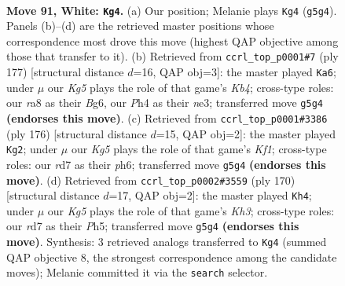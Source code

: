 \documentclass[11pt]{article}
\begin{document}
\clearpage

\begin{figure}[p]\centering
\begin{subfigure}{0.46\textwidth}\centering
\resizebox{\linewidth}{!}{%
\newchessgame
\chessboard[
  setfen={r7/2kr4/8/5RK1/7P/8/8/8 w - - 23 91},
  showmover=false,
  pgfstyle=straightmove, color=movearrow, markmove={g5-g4}
]}
\caption{}
\end{subfigure}\hfill
\begin{subfigure}{0.46\textwidth}\centering
\resizebox{\linewidth}{!}{%
\newchessgame
\chessboard[
  setfen={8/5p2/6b1/rk6/8/4N3/8/2R1K3 b - - 1 89},
  showmover=false,
  pgfstyle=straightmove, color=movearrow, markmove={b5-a6}
]}
\caption{}
\end{subfigure}
\\[4pt]
\begin{subfigure}{0.46\textwidth}\centering
\resizebox{\linewidth}{!}{%
\newchessgame
\chessboard[
  setfen={8/8/6kp/r7/8/6P1/5P2/4RK2 w - - 8 89},
  showmover=false,
  pgfstyle=straightmove, color=movearrow, markmove={f1-g2}
]}
\caption{}
\end{subfigure}\hfill
\begin{subfigure}{0.46\textwidth}\centering
\resizebox{\linewidth}{!}{%
\newchessgame
\chessboard[
  setfen={8/8/5k2/7P/8/5PRK/8/r7 w - - 1 86},
  showmover=false,
  pgfstyle=straightmove, color=movearrow, markmove={h3-h4}
]}
\caption{}
\end{subfigure}
\caption{\textbf{Move 91, White: \texttt{Kg4}.} (a) Our position; Melanie plays \texttt{Kg4} (\texttt{g5g4}). Panels (b)--(d) are the retrieved master positions whose correspondence most drove this move (highest QAP objective among those that transfer to it). (b) Retrieved from \texttt{ccrl\_top\_p0001\#7} (ply 177) [structural distance $d$=16, QAP obj=3]: the master played \texttt{Ka6}; under $\mu$ our \emph{Kg5} plays the role of that game's \emph{Kb4}; cross-type roles: our \emph{r}a8 as their \emph{B}g6, our \emph{P}h4 as their \emph{n}e3; transferred move \texttt{g5g4} \textbf{(endorses this move)}. (c) Retrieved from \texttt{ccrl\_top\_p0001\#3386} (ply 176) [structural distance $d$=15, QAP obj=2]: the master played \texttt{Kg2}; under $\mu$ our \emph{Kg5} plays the role of that game's \emph{Kf1}; cross-type roles: our \emph{r}d7 as their \emph{p}h6; transferred move \texttt{g5g4} \textbf{(endorses this move)}. (d) Retrieved from \texttt{ccrl\_top\_p0002\#3559} (ply 170) [structural distance $d$=17, QAP obj=2]: the master played \texttt{Kh4}; under $\mu$ our \emph{Kg5} plays the role of that game's \emph{Kh3}; cross-type roles: our \emph{r}d7 as their \emph{P}h5; transferred move \texttt{g5g4} \textbf{(endorses this move)}. Synthesis: 3 retrieved analogs transferred to \texttt{Kg4} (summed QAP objective 8, the strongest correspondence among the candidate moves); Melanie committed it via the \texttt{search} selector.}
\label{fig:thought-m180}
\end{figure}
\end{document}
